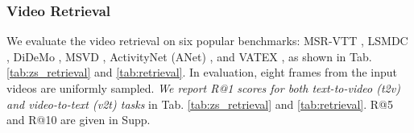 \begin{table}[!t]
\caption{Results of finetuning video retrieval in both text-to-video (T2V) and video-to-text (V2T) on MSR-VTT, LSMDC, DiDeMo, MSVD, ActivityNet (ANet), and VATEX. }
\centering
\small
{}
\label{tab:retrieval}
\end{table}

\subsubsection{Video Retrieval} \label{sec:retrieval}
We evaluate the video retrieval on six popular benchmarks: MSR-VTT \cite{msrvtt}, LSMDC \cite{lsmdc}, DiDeMo \cite{didemo}, MSVD \cite{msvd}, ActivityNet (ANet) \cite{activitynet}, and VATEX \cite{vatex}, as shown in Tab. \ref{tab:zs_retrieval} and \ref{tab:retrieval}. In evaluation, eight frames from the input videos are uniformly sampled. \textit{We report R@1 scores for both text-to-video (t2v) and video-to-text (v2t) tasks} in Tab. \ref{tab:zs_retrieval} and \ref{tab:retrieval}. R@5 and R@10 are given in Supp.

